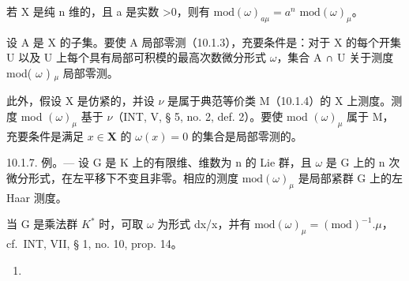 若 X 是纯 n 维的，且 a 是实数 \textgreater0，则有 \(\text{mod}(\omega)_{a\mu} = a^{n} \text{ mod}(\omega)_{\mu}\)。

设 A 是 X 的子集。要使 A 局部零测（10.1.3），充要条件是：对于 X 的每个开集 U 以及 U 上每个具有局部可积模的最高次数微分形式 \(\omega\)，集合 A ∩ U 关于测度 mod( \(\omega\) ) \(_{\mu}\) 局部零测。

此外，假设 X 是仿紧的，并设 \(\nu\) 是属于典范等价类 M（10.1.4）的 X 上测度。测度 mod \((\omega)_{\mu}\) 基于 \(\nu\)（INT, V, § 5, no. 2, def. 2）。要使 mod \((\omega)_{\mu}\) 属于 M，充要条件是满足 \(x \in \mathbf{X}\) 的 \(\omega(x) = 0\) 的集合是局部零测的。

10.1.7. 例。--- 设 G 是 K 上的有限维、维数为 n 的 Lie 群，且 \(\omega\) 是 G 上的 n 次微分形式，在左平移下不变且非零。相应的测度 \(\text{mod}(\omega)_{\mu}\) 是局部紧群 G 上的左 Haar 测度。

当 G 是乘法群 \(K^{*}\) 时，可取 \(\omega\) 为形式 dx/x，并有 \(\text{mod}(\omega)_{\mu} = (\text{mod})^{-1}.\mu\)，cf.~INT, VII, § 1, no. 10, prop. 14。
\begin{enumerate}
\def\labelenumi{(\arabic{enumi})}
\setcounter{enumi}{6}
\tightlist
\item
\end{enumerate}
